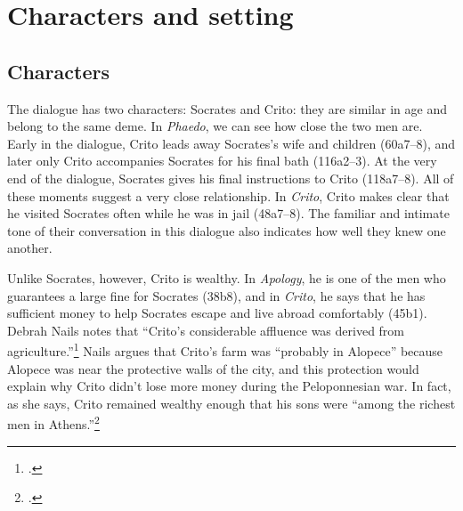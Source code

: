 \documentclass[12pt,letterpaper]{article}
\newcommand{\MONTH}{%
  \ifcase\the\month
  \or January%
  \or February%
  \or March%
  \or April%
  \or May%
  \or June%
  \or July%
  \or August%
  \or September%
  \or October%
  \or November%
  \or December%
  \fi}
\begin{document}

\pagestyle{notes}

\section*{Characters and setting}

\subsection*{Characters}

The dialogue has two characters: Socrates and Crito: they are similar in age and belong to the same deme. In \textit{Phaedo}, we can see how close the two men are. Early in the dialogue, Crito leads away Socrates's wife and children (60a7--8), and later only Crito accompanies Socrates for his final bath (116a2--3). At the very end of the dialogue, Socrates gives his final instructions to Crito (118a7--8). All of these moments suggest a very close relationship. In \textit{Crito}, Crito makes clear that he visited Socrates often while he was in jail (48a7--8). The familiar and intimate tone of their conversation in this dialogue also indicates how well they knew one another.

Unlike Socrates, however, Crito is wealthy. In \textit{Apology}, he is one of the men who guarantees a large fine for Socrates (38b8), and in \textit{Crito}, he says that he has sufficient money to help Socrates escape and live abroad comfortably (45b1). Debrah Nails notes that ``Crito's considerable affluence was derived from agriculture.''\footcite[][115. She cites \textit{Euthydemus} 291e, Xenophon's \textit{Memorabilia} 2.9.4, and Diogenes Laertius 2.31.]{nails2002-people-of-plato} Nails argues that Crito's farm was ``probably in Alopece'' because Alopece was near the protective walls of the city, and this protection would explain why Crito didn't lose more money during the Peloponnesian war. In fact, as she says, Crito remained wealthy enough that his sons were ``among the richest men in Athens.''\footcite[][115]{nails2002-people-of-plato}
\end{document}
